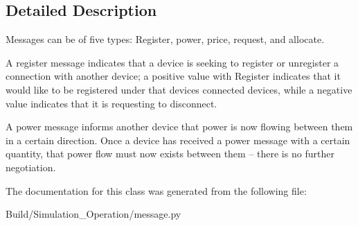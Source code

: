 \subsection{Detailed Description}
Messages can be of five types\+: Register, power, price, request, and allocate. 

A register message indicates that a device is seeking to register or unregister a connection with another device; a positive value with Register indicates that it would like to be registered under that device\textquotesingle{}s connected devices, while a negative value indicates that it is requesting to disconnect.

A power message informs another device that power is now flowing between them in a certain direction. Once a device has received a power message with a certain quantity, that power flow must now exists between them -- there is no further negotiation. 

The documentation for this class was generated from the following file\+:\begin{DoxyCompactItemize}
\item 
Build/\+Simulation\+\_\+\+Operation/message.\+py\end{DoxyCompactItemize}
